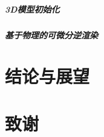 \documentclass{scutmaster}
\begin{document}
\paragraph{3D模型初始化}

\paragraph{基于物理的可微分逆渲染}

\chapter{结论与展望}

\backmatter


\chapter{致谢}
\end{document}
